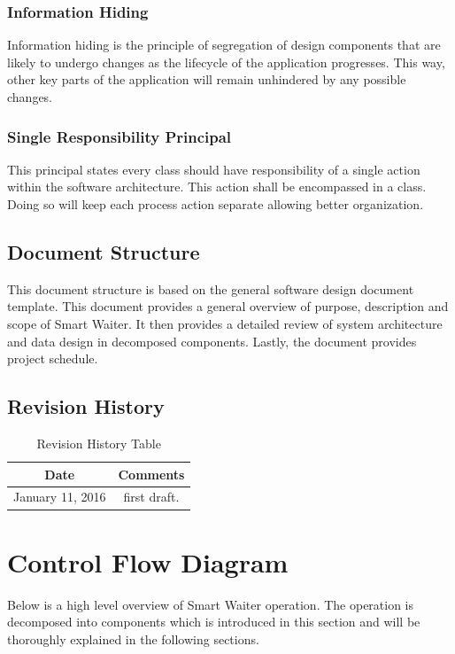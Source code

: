 \documentclass[12pt, titlepage]{article}
\begin{document}
\subsubsection{Information Hiding}
Information hiding is the principle of segregation of design components that are likely to undergo changes as the lifecycle of the application progresses. This way, other key parts of the application will remain unhindered by any possible changes.

\subsubsection{Single Responsibility Principal}
This principal states every class should have responsibility of a single action within the software architecture. This action shall be encompassed in a class. Doing so will keep each process action separate allowing better organization. 

\subsection{Document Structure}
This document structure is based on the general software design document template. This document provides a general overview of purpose, description and scope of Smart Waiter. It then provides a detailed review of system architecture and data design in decomposed components. Lastly, the document provides project schedule. 

\subsection{Revision History}

\begin{table}[H]
\begin{tabular}{|c|c|}
\hline
\textbf{Date}  & \textbf{Comments} \\ \hline
January 11, 2016 &  first draft. \\ 
\hline
\end{tabular}
\caption{Revision History Table}
\end{table}

\section{Control Flow Diagram}
Below is a high level overview of Smart Waiter operation. The operation is decomposed into components which is introduced in this section and will be thoroughly explained in the following sections. 
\end{document}
